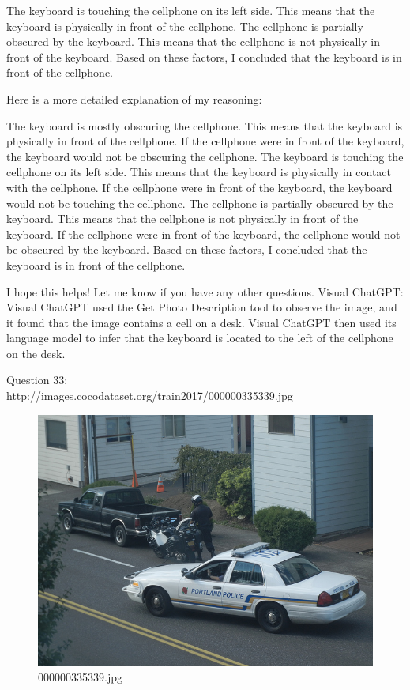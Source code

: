 \begin{enumerate}
        The keyboard is touching the cellphone on its left side. This means that the keyboard is physically in front of the cellphone.
        The cellphone is partially obscured by the keyboard. This means that the cellphone is not physically in front of the keyboard.
        Based on these factors, I concluded that the keyboard is in front of the cellphone.
        
        Here is a more detailed explanation of my reasoning:
        
        The keyboard is mostly obscuring the cellphone. This means that the keyboard is physically in front of the cellphone. If the cellphone were in front of the keyboard, the keyboard would not be obscuring the cellphone.
        The keyboard is touching the cellphone on its left side. This means that the keyboard is physically in contact with the cellphone. If the cellphone were in front of the keyboard, the keyboard would not be touching the cellphone.
        The cellphone is partially obscured by the keyboard. This means that the cellphone is not physically in front of the keyboard. If the cellphone were in front of the keyboard, the cellphone would not be obscured by the keyboard.
        Based on these factors, I concluded that the keyboard is in front of the cellphone.
        
        I hope this helps! Let me know if you have any other questions.
        \subitem Visual ChatGPT: Visual ChatGPT used the Get Photo Description tool to observe the image, and it found that the image contains a cell on a desk. Visual ChatGPT then used its language model to infer that the keyboard is located to the left of the cellphone on the desk.
    \end{enumerate}
    Question 33:\\http://images.cocodataset.org/train2017/000000335339.jpg
    \begin{figure}[h]
        \centering
        \includegraphics[width=0.8\linewidth]{../image set/easy/000000335339.jpg}
        \caption{000000335339.jpg}
    \end{figure} 
